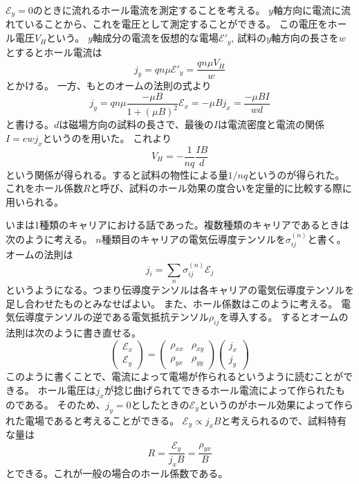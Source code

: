 \documentclass[11pt,dvipdfmx,a4paper]{jsarticle}
\numberwithin{equation}{section}
\begin{document}
\(\mathscr{E}_y=0\)のときに流れるホール電流を測定することを考える。
\(y\)軸方向に電流に流れていることから、これを電圧として測定することができる。
この電圧をホール電圧\(V_H\)という。
\(y\)軸成分の電流を仮想的な電場\(\mathscr{E}'_y\), 試料の\(y\)軸方向の長さを\(w\)とするとホール電流は
\begin{equation}
	j_y = qn\mu\mathscr{E}'_y = \frac{qn\mu V_H}{w}
\end{equation}
とかける。
一方、もとのオームの法則の式より
\begin{equation}
	j_y= qn\mu \frac{-\mu B}{1+(\mu B)^2} \mathscr{E}_x = -\mu B j_x = \frac{-\mu B I}{wd}
\end{equation}
と書ける。\(d\)は磁場方向の試料の長さで、最後の\(I\)は電流密度と電流の関係\(I=ewj_x\)というのを用いた。
これより
\begin{equation}
	V_H = -\frac{1}{nq} \frac{IB}{d}
\end{equation}
という関係が得られる。すると試料の物性による量\(1/nq\)というのが得られた。
これをホール係数\(R\)と呼び、試料のホール効果の度合いを定量的に比較する際に用いられる。

いまは1種類のキャリアにおける話であった。複数種類のキャリアであるときは次のように考える。
\(n\)種類目のキャリアの電気伝導度テンソルを\(\sigma_{ij}^{(n)}\)と書く。
オームの法則は
\begin{equation}
	j_i = \sum_n \sigma_{ij}^{(n)}\mathscr{E}_j
\end{equation}
というようになる。つまり伝導度テンソルは各キャリアの電気伝導度テンソルを足し合わせたものとみなせばよい。
また、ホール係数はこのように考える。
電気伝導度テンソルの逆である電気抵抗テンソル\(\rho_{ij}\)を導入する。
するとオームの法則は次のように書き直せる。
\begin{equation}
	\begin{pmatrix}
		\mathscr{E}_x\\ \mathscr{E}_y
	\end{pmatrix}
	=
	\begin{pmatrix}
		\rho_{xx} & \rho_{xy}\\
		\rho_{yx} & \rho_{yy}
	\end{pmatrix}
	\begin{pmatrix}
		j_x \\j_y
	\end{pmatrix}
\end{equation}
このように書くことで、電流によって電場が作られるというように読むことができる。
ホール電圧は\(j_x\)が捻じ曲げられてできるホール電流によって作られたものである。
そのため、\(j_y=0\)としたときの\(\mathscr{E}_y\)というのがホール効果によって作られた電場であると考えることができる。
\(\mathscr{E}_y \propto j_x B\)と考えられるので、試料特有な量は
\begin{equation}
	R = \frac{\mathscr{E}_y}{j_x B} = \frac{\rho_{yx}}{B}
\end{equation}
とできる。これが一般の場合のホール係数である。
\end{document}
